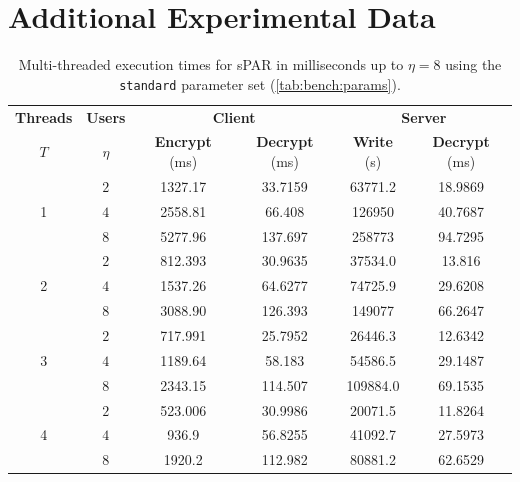 \chapter{Additional Experimental Data}
\label{appendix:data}

\newcommand{\perUser}[2]{\fpeval{#2 / #1}}

\begin{table}[H]
    \caption{Multi-threaded execution times for sPAR in milliseconds up to $\eta=8$ using the \texttt{standard} parameter set (\cref{tab:bench:params}).}
    \label{tab:bench:spar-multithreaded}
    \centering
    \begin{tabular}{cc|cc|cc}
        \toprule
        \textbf{Threads}   & \textbf{Users}  & \multicolumn{2}{c|}{\textbf{Client}} & \multicolumn{2}{c}{\textbf{Server}} \\ 
        $T$                & $\eta$          & \textbf{Encrypt} (ms) & \textbf{Decrypt} (ms)  & \textbf{Write} (s) & \textbf{Decrypt} (ms)   \\
        \hline
        \multirow{3}{*}{1} & $2$    & 1327.17 &  33.7159 &  63771.2 &  18.9869  \\
                           & $4$    & 2558.81 &   66.408 &   126950 &  40.7687  \\
                           & $8$    & 5277.96 &  137.697 &   258773 &  94.7295  \\
        \hline
        \multirow{3}{*}{2} & $2$    & 812.393 & 30.9635 & 37534.0 & 13.816   \\
                           & $4$    & 1537.26 & 64.6277 & 74725.9 & 29.6208  \\
                           & $8$    & 3088.90 & 126.393 & 149077  & 66.2647  \\
        \hline
        \multirow{3}{*}{3} & $2$    & 717.991   &  25.7952  &  26446.3  &  12.6342  \\
                           & $4$    & 1189.64   &  58.183   &  54586.5  &  29.1487  \\
                           & $8$    & 2343.15   &  114.507  &  109884.0 &  69.1535  \\
        \hline
        \multirow{3}{*}{4} & $2$    & 523.006   &  30.9986  &  20071.5  &  11.8264  \\
                           & $4$    & 936.9     &  56.8255  &  41092.7  &  27.5973  \\
                           & $8$    & 1920.2    &  112.982  &  80881.2  &  62.6529  \\

\end{tabular}
\end{table}

